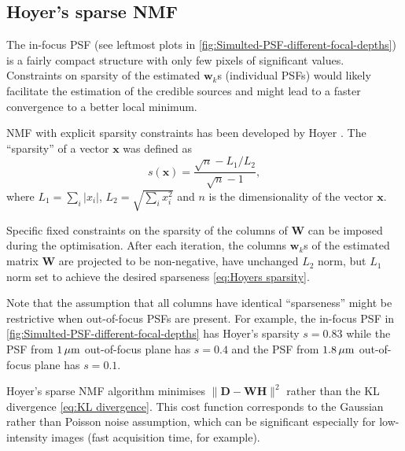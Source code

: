 
\subsection{Hoyer's sparse NMF \label{sub:Hoyer}}
The in-focus PSF (see leftmost plots in  \autoref{fig:Simulted-PSF-different-focal-depths}) is a fairly compact structure with only few pixels of significant values. Constraints on sparsity of the estimated $\bm{w}_k$s (individual PSFs) would likely facilitate the estimation of the credible sources and might lead to a faster convergence to a better local minimum. 

NMF with explicit sparsity constraints has been developed by Hoyer \cite{Hoyer2004}. The ``sparsity'' of a vector $\bm{x}$ was defined as 
%
\begin{equation}
	s(\bm{x})=\frac{\sqrt{n}-L_1/L_2}{\sqrt{n}-1},
	\label{eq:Hoyers sparsity}
\end{equation}
%
where $L_1=\sum_i|x_i|$, $L_2=\sqrt{\sum_i x^2_i}$ and $n$ is the dimensionality of the vector $\bm{x}$.

Specific fixed constraints on the sparsity of the columns of $\bm{W}$ can be imposed during the optimisation. After each iteration, the columns $\bm{w}_k$s of the estimated matrix $\bm{W}$ are projected to be non-negative, have unchanged $L_2$ norm, but $L_1$ norm set to achieve the desired sparseness \autoref{eq:Hoyers sparsity}.

Note that the assumption that all columns have identical ``sparseness'' might be restrictive when out-of-focus PSFs are present. For example, the in-focus PSF in \autoref{fig:Simulted-PSF-different-focal-depths} has Hoyer's sparsity $s=0.83$ while the PSF from $1 \, \mathrm{\mu m}$ out-of-focus plane has $s=0.4$ and the PSF from $1.8 \, \mathrm{\mu m}$ out-of-focus plane  has $s=0.1$.

Hoyer's sparse NMF algorithm minimises $\|\bm{D} - \bm{WH}\|^2$ rather than the KL divergence \autoref{eq:KL divergence}. This cost function corresponds to the Gaussian rather than Poisson noise assumption, which can be significant especially for low-intensity images (fast acquisition time, for example). 

